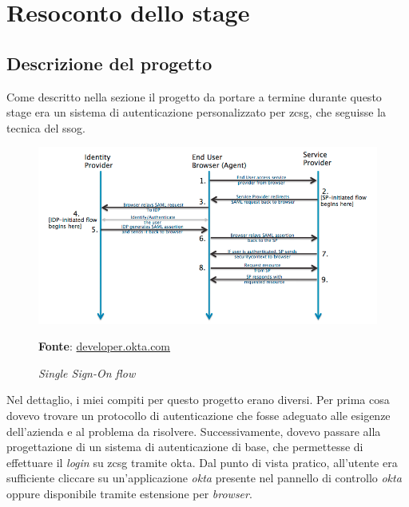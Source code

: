 
\chapter{Resoconto dello stage}
\label{cap:resoconto}

\section{Descrizione del progetto}
Come descritto nella sezione  il progetto da portare a termine durante questo stage era un sistema di autenticazione personalizzato per \gls{zcsg}, che seguisse la tecnica del \gls{ssog}. \\

    \begin{figure}[h]
        \centering
        \includegraphics[width=1\textwidth]{immagini/sso_flow.png}
        \caption{\textit{Single Sign-On flow}}
        \textbf{Fonte}:
        \href{https://developer.okta.com/docs/concepts/saml/#federated-identity}{developer.okta.com}
        \label{fig: Single Sign-On flow}
    \end{figure}

Nel dettaglio, i miei compiti per questo progetto erano diversi. Per prima cosa dovevo trovare un protocollo di autenticazione che fosse adeguato alle esigenze dell'azienda e al problema da risolvere. Successivamente, dovevo passare alla progettazione di un sistema di autenticazione di base, che permettesse di effettuare il \textit{login} su \gls{zcsg} tramite \gls{okta}. Dal punto di vista pratico, all'utente era sufficiente cliccare su un'applicazione \textit{okta} presente nel pannello di controllo \textit{okta} oppure disponibile tramite estensione per \textit{browser}.

